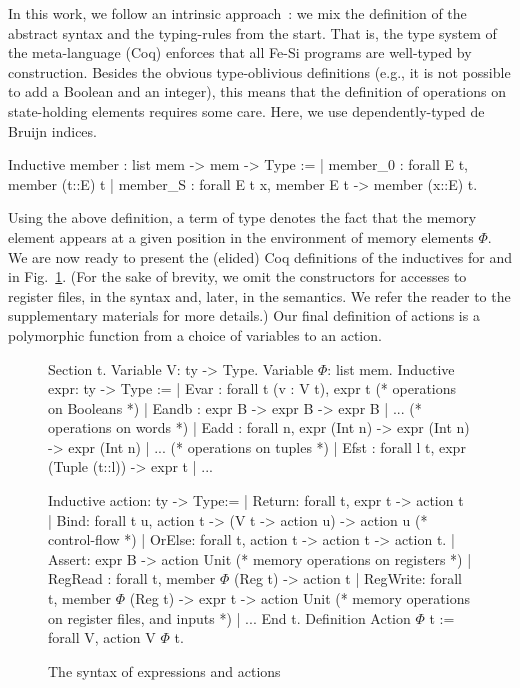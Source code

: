 \documentclass[preprint]{sigplanconf}
\begin{document}
In this work, we follow an intrinsic
approach~\cite{DBLP:journals/jar/BentonHKM12}: we mix the definition
of the abstract syntax and the typing-rules from the start. That is,
the type system of the meta-language (Coq) enforces that all Fe-Si
programs are well-typed by construction.
%
Besides the obvious type-oblivious definitions (e.g., it is not
possible to add a Boolean and an integer), this means that the
definition of operations on state-holding elements requires some care.
%
Here, we use dependently-typed de Bruijn indices. 
\begin{coq}
Inductive member : list mem -> mem ->  Type :=
| member_0 : forall E t, member (t::E) t
| member_S : forall E t x, member E t -> member (x::E) t.
\end{coq}
Using the above definition, a term of type  denotes
the fact that the memory element  appears at a given position
in the environment of memory elements $\Phi$. 
%
We are now ready to present the (elided) Coq definitions of the
inductives for  and  in Fig.~\ref{fig:fesi}.
%
(For the sake of brevity, we omit the constructors for accesses to
register files, in the syntax and, later, in the semantics. We refer
the reader to the supplementary materials for more details.)
%
Our final definition  of actions is a polymorphic
function from a choice of variables to an action.

\begin{figure}
  \centering
\begin{coq}
Section t. 
Variable V: ty -> Type. Variable $\Phi$: list mem. 
Inductive expr: ty -> Type :=
| Evar : forall t (v : V t), expr t
(* operations on Booleans *)
| Eandb : expr B -> expr B -> expr B | ... 
(* operations on words *)
| Eadd : forall n, expr (Int n) -> expr (Int n) -> expr (Int n) | ... 
(* operations on tuples *)
| Efst : forall l t, expr (Tuple (t::l)) -> expr t | ...

Inductive action: ty -> Type:=
| Return: forall t, expr t -> action t
| Bind: forall t u,  action  t -> (V t -> action u) -> action u
(* control-flow *)
| OrElse: forall t, action t -> action t -> action t.
| Assert: expr B -> action Unit    
(* memory operations on registers *)
| RegRead : forall t, member $\Phi$ (Reg t) -> action t
| RegWrite: forall t, member $\Phi$ (Reg t) -> expr t -> action Unit
(* memory operations on register files, and inputs *)
| ... 
End t. 
Definition Action $\Phi$ t := forall V, action V $\Phi$ t.  
\end{coq}
  \caption{The syntax of expressions and actions}
  \label{fig:fesi}
\end{figure}
\end{document}
